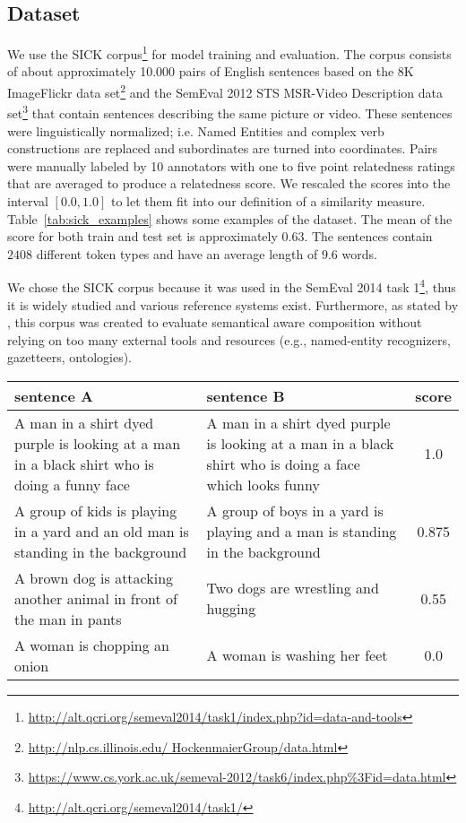 \subsection{Dataset}
We use the SICK corpus\footnote{\url{http://alt.qcri.org/semeval2014/task1/index.php?id=data-and-tools}} \autocite{marelli_sick_2014} for model training and evaluation. The corpus consists of about approximately 10.000 pairs of English sentences based on the 8K ImageFlickr data set\footnote{\url{http://nlp.cs.illinois.edu/
HockenmaierGroup/data.html}} \autocite{hodosh_framing_2013} and the SemEval 2012 STS MSR-Video Description data set\footnote{\url{https://www.cs.york.ac.uk/semeval-2012/task6/index.php\%3Fid=data.html}} \autocite{agirre_semeval-2012_2012} that contain sentences describing the same picture or video. These sentences were linguistically normalized; i.e. Named Entities and complex verb constructions are replaced and subordinates are turned into coordinates. Pairs were manually %
labeled by 10 annotators with one to five point relatedness ratings that are averaged to produce a relatedness score. We rescaled the scores into the interval $[0.0, 1.0]$ to let them fit into our definition of a similarity measure. Table~\ref{tab:sick_examples} shows some examples of the dataset. The mean of the score for both train and test set is approximately $0.63$. The sentences contain $2408$ different token types and have an average length of $9.6$ words.  

We chose the SICK corpus because it was used in the SemEval 2014 task 1\footnote{\url{http://alt.qcri.org/semeval2014/task1/}}, thus it is widely studied and various reference systems exist. Furthermore, as stated by \textcite{marelli_semeval-2014_2014}, this corpus was created to evaluate semantical aware composition without relying on too many external tools and resources (e.g., named-entity recognizers, gazetteers, ontologies).

\begin{table*}[!htb]
\centering
  \begin{tabular}{p{}|p{}|c}
    sentence A & sentence B & score \\ \hline \hline
    A man in a shirt dyed purple is looking at a man in a black shirt who is doing a funny face & A man in a shirt dyed purple is looking at a man in a black shirt who is doing a face which looks funny & 1.0 \\ \hline
    A group of kids is playing in a yard and an old man is standing in the background & A group of boys in a yard is playing and a man is standing in the background & 0.875 \\ \hline
    A brown dog is attacking another animal in front of the man in pants & Two dogs are wrestling and hugging & 0.55 \\ \hline
    A woman is chopping an onion & A woman is washing her feet & 0.0
  \end{tabular}
  \caption{Example sentence pairs from SICK corpus with rescaled relatedness score ranging from $0.0$ (not related) to $1.0$ (maximal related).}
\label{tab:sick_examples}
\end{table*}

